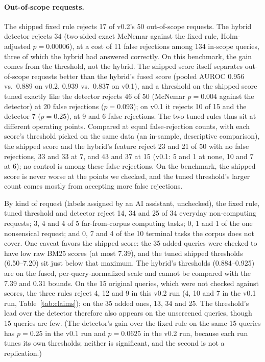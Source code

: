 \paragraph{Out-of-scope requests.}
\label{sec:ood}
The shipped fixed rule rejects 17 of v0.2's 50 out-of-scope requests. The hybrid detector rejects 34 (two-sided
exact McNemar against the fixed rule, Holm-adjusted $p=0.00006$), at a cost of 11 false rejections among 134 in-scope queries, three of
which the hybrid had answered correctly. On this benchmark, the gain comes from the threshold, not the hybrid. The shipped score
itself separates out-of-scope requests better than the hybrid's fused score (pooled AUROC 0.956 vs.\ 0.889 on v0.2,
0.939 vs.\ 0.837 on v0.1), and a threshold on the shipped score tuned exactly like the detector rejects 46 of 50
(McNemar $p=0.004$ against the detector) at 20 false rejections ($p=0.093$); on v0.1 it rejects 10 of 15 and the
detector 7 ($p=0.25$), at 9 and 6 false rejections. The two tuned rules thus sit at different operating points.
Compared at equal false-rejection counts, with each score's threshold picked on the same data (an in-sample,
descriptive comparison), the shipped score and the hybrid's feature reject 23 and 21 of 50 with no false
rejections, 33 and 33 at 7, and 43 and 37 at 15 (v0.1: 5 and 1 at none, 10 and 7 at 6); no control is among these
false rejections. On the benchmark, the shipped score is never worse at the points we checked, and the tuned threshold's larger count
comes mostly from accepting more false rejections.

By kind of request (labels assigned by an AI assistant, unchecked), the fixed rule, tuned threshold and detector
reject 14, 34 and 25 of 34 everyday non-computing requests; 3, 4 and 4 of 5 far-from-corpus computing tasks; 0, 1
and 1 of the one nonsensical request; and 0, 7 and 4 of the 10 terminal tasks the corpus does not cover. One caveat
favors the shipped score: the 35 added queries were checked to have low raw BM25 scores (at most 7.39), and the
tuned shipped thresholds (6.50--7.20) sit just below that maximum. The hybrid's thresholds (0.884--0.925) are on the
fused, per-query-normalized scale and cannot be compared with the 7.39 and 0.31 bounds. On the 15 original queries,
which were not checked against scores, the three rules reject 4, 12 and 9 in this v0.2 run (4, 10 and 7 in the v0.1
run, Table~\ref{tab:claims}); on the 35 added ones, 13, 34 and 25. The
threshold's lead over the detector therefore also appears on the unscreened queries, though 15 queries are few. (The
detector's gain over the fixed rule on the same 15 queries has $p=0.25$ in the v0.1 run and $p=0.0625$ in the v0.2
run, because each run tunes its own thresholds; neither is significant, and the second is not a replication.)


